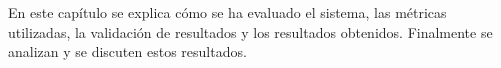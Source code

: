 En este capítulo se explica cómo se ha evaluado el sistema, las métricas utilizadas, la validación de resultados y los resultados obtenidos. Finalmente se analizan y se discuten estos resultados.